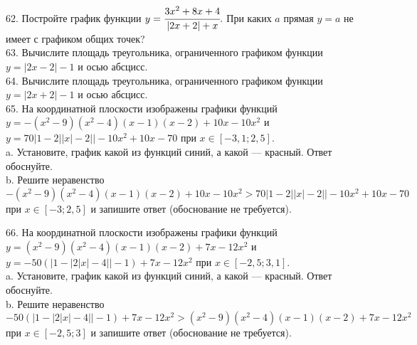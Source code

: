 62. Постройте график функции $y=\cfrac{3x^2+8x+4}{|2x+2|+x}.$ При каких $a$ прямая $y=a$ не имеет с графиком общих точек?\\
63. Вычислите площадь треугольника, ограниченного графиком функции $y=|2x-2|-1$ и осью абсцисс.\\
64. Вычислите площадь треугольника, ограниченного графиком функции $y=|2x+2|-1$ и осью абсцисс.\\
65. На координатной плоскости изображены графики функций $y=-(x^2-9)(x^2-4)(x-1)(x-2)+10x-10x^2$ и $y=70|1-2||x|-2||-10x^2+10x-70$ при
$x\in[-3,1;2,5].$\\
a. Установите, график какой из функций синий, а какой --- красный. Ответ обоснуйте.\\
b. Решите неравенство  $-(x^2-9)(x^2-4)(x-1)(x-2)+10x-10x^2 >70|1-2||x|-2||-10x^2+10x-70$ при
$x\in[-3;2,5]$ и запишите ответ (обоснование не требуется).
\begin{center}\end{center}
66. На координатной плоскости изображены графики функций $y=(x^2-9)(x^2-4)(x-1)(x-2)+7x-12x^2$ и $y=-50(|1-|2|x|-4||-1)+7x-12x^2$ при
$x\in[-2,5;3,1].$\\
a. Установите, график какой из функций синий, а какой --- красный. Ответ обоснуйте.\\
b. Решите неравенство  $-50(|1-|2|x|-4||-1)+7x-12x^2 >(x^2-9)(x^2-4)(x-1)(x-2)+7x-12x^2$ при
$x\in[-2,5;3]$ и запишите ответ (обоснование не требуется).
\begin{center}\end{center}
